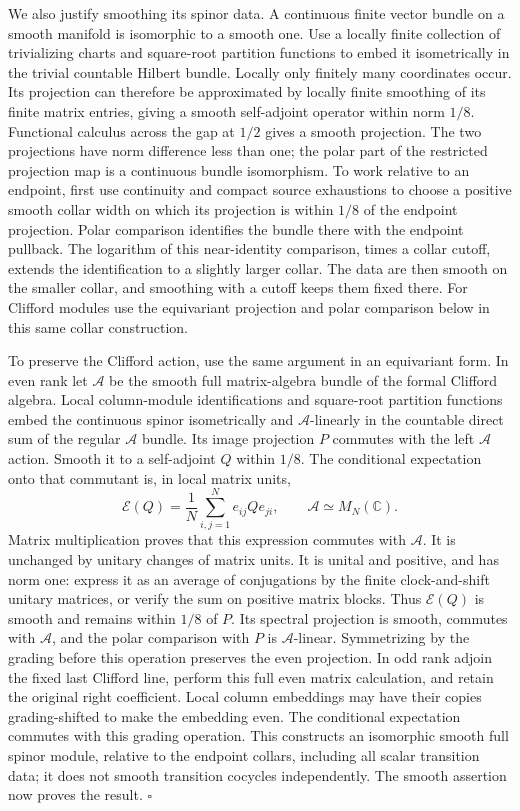 \documentclass[
  11pt,
]{article}
\begin{document}
We also justify smoothing its spinor data. A continuous finite vector
bundle on a smooth manifold is isomorphic to a smooth one. Use a locally
finite collection of trivializing charts and square-root partition
functions to embed it isometrically in the trivial countable Hilbert
bundle. Locally only finitely many coordinates occur. Its projection can
therefore be approximated by locally finite smoothing of its finite
matrix entries, giving a smooth self-adjoint operator within norm
\(1/8\). Functional calculus across the gap at \(1/2\) gives a smooth
projection. The two projections have norm difference less than one; the
polar part of the restricted projection map is a continuous bundle
isomorphism. To work relative to an endpoint, first use continuity and
compact source exhaustions to choose a positive smooth collar width on
which its projection is within \(1/8\) of the endpoint projection. Polar
comparison identifies the bundle there with the endpoint pullback. The
logarithm of this near-identity comparison, times a collar cutoff,
extends the identification to a slightly larger collar. The data are
then smooth on the smaller collar, and smoothing with a cutoff keeps
them fixed there. For Clifford modules use the equivariant projection
and polar comparison below in this same collar construction.

To preserve the Clifford action, use the same argument in an equivariant
form. In even rank let \(\mathcal A\) be the smooth full matrix-algebra
bundle of the formal Clifford algebra. Local column-module
identifications and square-root partition functions embed the continuous
spinor isometrically and \(\mathcal A\)-linearly in the countable direct
sum of the regular \(\mathcal A\) bundle. Its image projection \(P\)
commutes with the left \(\mathcal A\) action. Smooth it to a
self-adjoint \(Q\) within \(1/8\). The conditional expectation onto that
commutant is, in local matrix units, \[
 \mathcal E(Q)=\frac1N\sum_{i,j=1}^N e_{ij}Qe_{ji},
 \qquad\mathcal A\simeq M_N(\mathbb C).
\] Matrix multiplication proves that this expression commutes with
\(\mathcal A\). It is unchanged by unitary changes of matrix units. It
is unital and positive, and has norm one: express it as an average of
conjugations by the finite clock-and-shift unitary matrices, or verify
the sum on positive matrix blocks. Thus \(\mathcal E(Q)\) is smooth and
remains within \(1/8\) of \(P\). Its spectral projection is smooth,
commutes with \(\mathcal A\), and the polar comparison with \(P\) is
\(\mathcal A\)-linear. Symmetrizing by the grading before this operation
preserves the even projection. In odd rank adjoin the fixed last
Clifford line, perform this full even matrix calculation, and retain the
original right coefficient. Local column embeddings may have their
copies grading-shifted to make the embedding even. The conditional
expectation commutes with this grading operation. This constructs an
isomorphic smooth full spinor module, relative to the endpoint collars,
including all scalar transition data; it does not smooth transition
cocycles independently. The smooth assertion now proves the result.
\(\square\)
\end{document}
